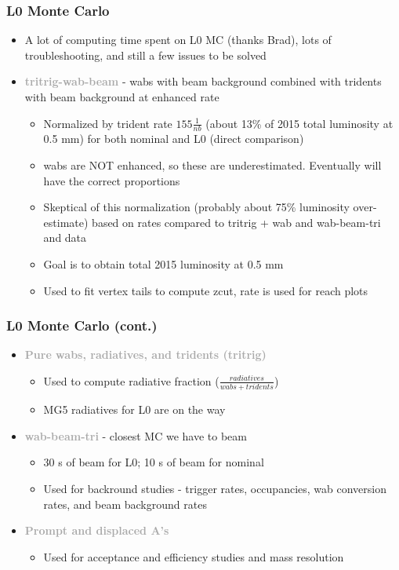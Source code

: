 \documentclass{beamer}
\begin{document}
\begin{frame}
\frametitle{L0 Monte Carlo}
\begin{itemize}
\item A lot of computing time spent on L0 MC (thanks Brad), lots of troubleshooting, and still a few issues to be solved
\item \textcolor{darkgray}{\textbf{tritrig-wab-beam}} - wabs with beam background combined with tridents with beam background at enhanced rate
\begin{itemize}
\item Normalized by trident rate $155 \frac{1}{nb}$ (about 13\% of 2015 total luminosity at 0.5 mm) for both nominal and L0 (direct comparison)
\item wabs are NOT enhanced, so these are underestimated. Eventually will have the correct proportions
\item Skeptical of this normalization (probably about 75\% luminosity over-estimate) based on rates compared to tritrig + wab and wab-beam-tri and data
\item Goal is to obtain total 2015 luminosity at 0.5 mm
\item Used to fit vertex tails to compute zcut, rate is used for reach plots
\end{itemize}
\end{itemize}

\end{frame}


\begin{frame}
\frametitle{L0 Monte Carlo (cont.)}
\begin{itemize}
\item \textcolor{darkgray}{\textbf{Pure wabs, radiatives, and tridents (tritrig)}}
\begin{itemize}
\item Used to compute radiative fraction ($\frac{radiatives}{wabs + tridents}$)
\item MG5 radiatives for L0 are on the way
\end{itemize}
\item \textcolor{darkgray}{\textbf{wab-beam-tri}} - closest MC we have to beam
\begin{itemize}
\item 30 s of beam for L0; 10 s of beam for nominal
\item Used for backround studies - trigger rates, occupancies, wab conversion rates, and beam background rates
\end{itemize}
\item \textcolor{darkgray}{\textbf{Prompt and displaced A's}}
\begin{itemize}
\item Used for acceptance and efficiency studies and mass resolution
\end{itemize}
\end{itemize}

\end{frame}
\end{document}

